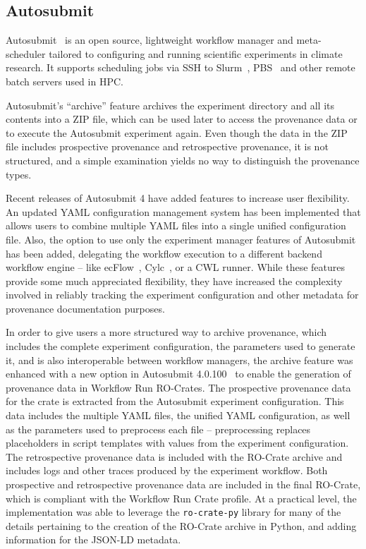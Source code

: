 \documentclass[10pt,letterpaper]{article}
\begin{document}
\subsection{Autosubmit}\label{autosubmit}

Autosubmit~\cite{Manubens-Gil 2016} is an open source, lightweight workflow manager and meta-scheduler tailored to configuring and running scientific experiments in climate research. It supports scheduling jobs via SSH to Slurm~\cite{Yoo 2003}, PBS~\cite{Feng 2007} and other remote batch servers used in HPC.

Autosubmit's ``archive'' feature archives the experiment directory and all its contents into a ZIP file, which can be used later to access the provenance data or to execute the Autosubmit experiment again.
Even though the data in the ZIP file includes prospective provenance and retrospective provenance, it is not structured, and a simple examination yields no way to distinguish the provenance types.

Recent releases of Autosubmit 4 have added features to increase user flexibility.  An updated YAML configuration management system has been implemented that allows users to combine multiple YAML files into a single unified configuration file.
Also, the option to use only the experiment manager features of Autosubmit has been added, delegating the workflow execution to a different backend workflow engine -- like ecFlow~\cite{Bahra 2011}, Cylc~\cite{Oliver 2019}, or a CWL runner.
While these features provide some much appreciated flexibility, they have increased the complexity involved in reliably tracking the experiment configuration and other metadata for provenance documentation purposes.

In order to give users a more structured way to archive provenance, which includes the complete experiment configuration, the parameters used to generate it, and is also interoperable between workflow managers, the archive feature was enhanced with a new option in Autosubmit 4.0.100~\cite{Beltran 2023} to enable the generation of provenance data in Workflow Run RO-Crates.
%
The prospective provenance data for the crate is extracted from the Autosubmit experiment configuration.
This data includes the multiple YAML files, the unified YAML configuration, as well as the parameters used to preprocess each file -- preprocessing replaces placeholders in script templates with values from the experiment configuration.
The retrospective provenance data is included with the RO-Crate archive and includes logs and other traces produced by the experiment workflow.
Both prospective and retrospective provenance data are included in the final RO-Crate, which is compliant with the Workflow Run Crate profile.
%
At a practical level, the implementation was able to leverage the \texttt{ro-crate-py} library for many of the details pertaining to the creation of the RO-Crate archive in Python, and adding information for the JSON-LD metadata.
\end{document}
